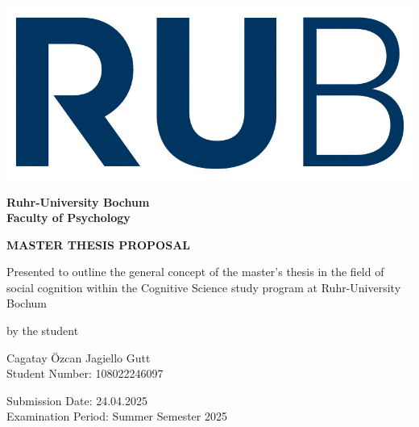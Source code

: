 \documentclass[12pt]{article} %
\begin{document}


\begin{titlepage}
    \begin{center}
        \begin{minipage}{0.2\textwidth}
            \includegraphics[width=1.5\textwidth]{EV_images/rub.jpg} %
        \end{minipage}
        \hspace*{\fill}
        \begin{minipage}{0.6\textwidth}
            \hspace*{\fill}\textbf{Ruhr-University Bochum} \\ \hspace*{\fill}\textbf{Faculty of Psychology}
        \end{minipage}

        \vspace{2 cm}
        {\textbf{\large MASTER THESIS PROPOSAL}}

        \vspace{0.2cm}
        Presented to outline the general concept of the master's thesis in the field of social cognition within the Cognitive Science study program at Ruhr-University Bochum

        \vspace{0.5cm}
        by the student

        \vspace{0.5cm}
        Cagatay Özcan Jagiello Gutt\\
        Student Number: 108022246097

        \vspace{0.5cm}
        Submission Date: 24.04.2025\\
        Examination Period: Summer Semester 2025


\end{center}
\end{titlepage}
\end{document}
